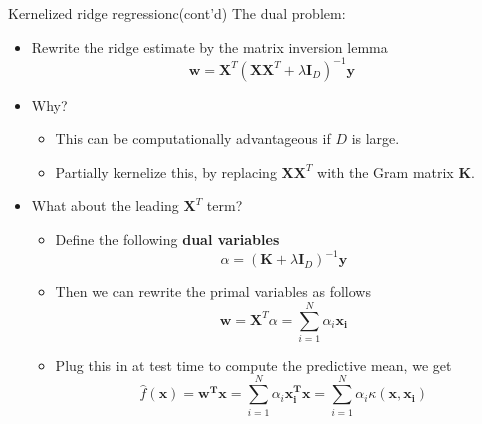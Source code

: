 \documentclass[10pt,mathserif]{beamer}
\begin{document}
\begin{frame}{Kernelized ridge regressionc(cont'd)}
The dual problem:
\begin{itemize}
    \item Rewrite the ridge estimate by the matrix inversion lemma
    \begin{equation*}
        \bm{w} = \bm{X}^T(\bm{X}\bm{X}^T +\lambda \bm{I}_D)^{-1}\bm{y} 
    \end{equation*}
    \item Why?
    \begin{itemize}
        \item This can be computationally advantageous if $D$ is large.
        \item Partially kernelize this, by replacing $\bm{X}\bm{X}^T$ with the Gram matrix $\bm{K}$.
    \end{itemize}
    \item What about the leading $\bm{X}^T$ term?
    \begin{itemize}
        \item Define the following \textbf{dual variables}
        \begin{equation*}
            \alpha =  (\bm{K} + \lambda \bm{I}_D)^{-1}\bm{y}
        \end{equation*}
        \item  Then we can rewrite the primal variables as follows
    \begin{equation*}
        \bm{w} = \bm{X}^T\alpha = \sum_{i=1}^N \alpha_i \bm{\bm{x}_i}
    \end{equation*}
    \item  Plug this in at test time to compute the predictive mean, we get
        \begin{equation*}
            \hat{f}(\bm{x}) = \bm{w^T x} = \sum_{i=1}^N \alpha_i \bm{\bm{x}_i^T x} = \sum_{i=1}^N \alpha_i\kappa(\bm{x,\bm{x}_i})
        \end{equation*}
    \end{itemize}
\end{itemize}
\end{frame}
\end{document}
